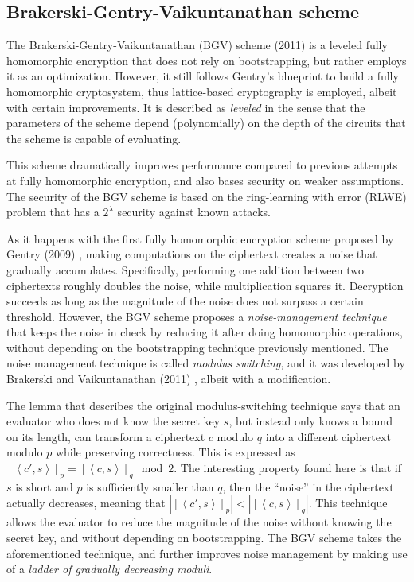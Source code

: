 \subsection{Brakerski-Gentry-Vaikuntanathan scheme}

The Brakerski-Gentry-Vaikuntanathan (BGV) scheme (2011) \cite{cryptoeprint:2011:277} is a leveled fully homomorphic encryption that does not rely on bootstrapping, but rather employs it as an optimization. However, it still follows Gentry's blueprint to build a fully homomorphic cryptosystem, thus lattice-based cryptography is employed, albeit with certain improvements. It is described as \emph{leveled} in the sense that the parameters of the scheme depend (polynomially) on the depth of the circuits that the scheme is capable of evaluating.

This scheme dramatically improves performance compared to previous attempts at fully homomorphic encryption, and also bases security on weaker assumptions. The security of the BGV scheme is based on the ring-learning with error (RLWE) problem that has a $2^{\lambda}$ security against known attacks.

As it happens with the first fully homomorphic encryption scheme proposed by Gentry (2009) \cite{homoenc}, making computations on the ciphertext creates a noise that gradually accumulates. Specifically, performing one addition between two ciphertexts roughly doubles the noise, while multiplication squares it. Decryption succeeds as long as the magnitude of the noise does not surpass a certain threshold. However, the BGV scheme proposes a \emph{noise-management technique} that keeps the noise in check by reducing  it after doing homomorphic operations, without depending on the bootstrapping technique previously mentioned. The noise management technique is called \emph{modulus switching}, and it was developed by Brakerski and Vaikuntanathan (2011) \cite{cryptoeprint:2011:344}, albeit with a modification. 

The lemma that describes the original modulus-switching technique says that an evaluator who does not know the secret key $s$, but instead only knows a bound on its length, can transform a ciphertext $c$ modulo $q$ into a different ciphertext modulo $p$ while preserving correctness. This is expressed as $[\left \langle c',s \right \rangle]_{p} = [\left \langle c,s  \right \rangle]_{q} \mod 2$. The interesting property found here is that if $s$ is short and $p$ is sufficiently smaller than $q$, then the ``noise'' in the ciphertext actually decreases, meaning that $|[\left \langle c',s \right \rangle]_{p}| < |[\left \langle c,s \right \rangle]_{q}|$. This technique allows the evaluator to reduce the magnitude of the noise without knowing the secret key, and without depending on bootstrapping. The BGV scheme takes the aforementioned technique, and further improves noise management by making use of a \emph{ladder of gradually decreasing moduli}.  

